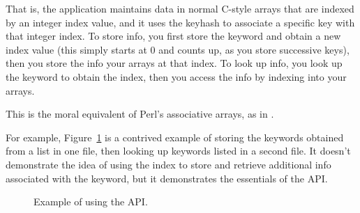 That is, the application maintains data in normal C-style arrays that
are indexed by an integer index value, and it uses the keyhash to
associate a specific key with that integer index. To store info, you
first store the keyword and obtain a new index value (this simply
starts at 0 and counts up, as you store successive keys), then you
store the info your arrays at that index. To look up info, you look up
the keyword to obtain the index, then you access the info by indexing
into your arrays.

This is the moral equivalent of Perl's associative arrays, as in
.

For example, Figure~\ref{fig:keyhash_example} is a contrived example
of storing the keywords obtained from a list in one file, then looking
up keywords listed in a second file. It doesn't demonstrate the idea
of using the index to store and retrieve additional info associated
with the keyword, but it demonstrates the essentials of the
 API.

\begin{figure}

\caption{Example of using the  API.}
\label{fig:keyhash_example}
\end{figure}

